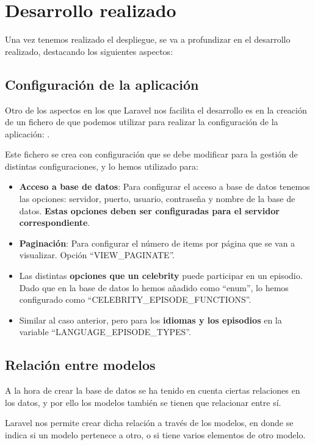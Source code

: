 \documentclass{\ClassPath/viu-tfm-template}
\begin{document}
\chapter{Desarrollo realizado}

Una vez tenemos realizado el despliegue, se va a profundizar en el desarrollo realizado, destacando los siguientes aspectos:

\section{Configuración de la aplicación}
Otro de los aspectos en los que Laravel nos facilita el desarrollo es en la creación de un fichero de que podemos utilizar para realizar la configuración de la aplicación: .

Este fichero se crea con configuración que se debe modificar para la gestión de distintas configuraciones, y lo hemos utilizado para:
\vspace{-1em}
\begin{itemize}
    \item \textbf{Acceso a base de datos}: Para configurar el acceso a base de datos tenemos las opciones: servidor, puerto, usuario, contraseña y nombre de la base de datos. \textbf{Estas opciones deben ser configuradas para el servidor correspondiente}.
    \item \textbf{Paginación}: Para configurar el número de items por página que se van a visualizar. Opción “VIEW\_PAGINATE”.
    \item Las distintas \textbf{opciones que un celebrity} puede participar en un episodio. Dado que en la base de datos lo hemos añadido como “enum”, lo hemos configurado como “CELEBRITY\_EPISODE\_FUNCTIONS”.
    \item Similar al caso anterior, pero para los \textbf{idiomas y los episodios} en la variable “LANGUAGE\_EPISODE\_TYPES”.
\end{itemize}
\vspace{-1em}

\section{Relación entre modelos}
A la hora de crear la base de datos se ha tenido en cuenta ciertas relaciones en los datos, y por ello los modelos también se tienen que relacionar entre sí.

Laravel nos permite crear dicha relación a través de los modelos, en donde se indica si un modelo pertenece a otro, o si tiene varios elementos de otro modelo.
\end{document}
